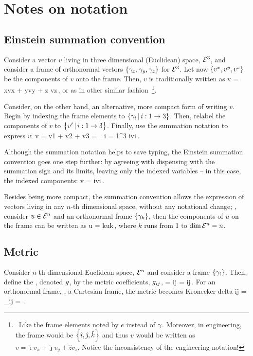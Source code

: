 \section{Notes on notation}

\subsection{Einstein summation convention}
Consider a vector $v$ living in three dimensional (Euclidean) space, $\mathcal{\mathcal{E}}^{3}$, and consider a frame of orthonormal vectors $\left\lbrace{\gamma_{x}, \gamma_{y}, \gamma_{z}}\right\rbrace$ for $\mathcal{\mathcal{E}}^{3}$. Let now $\left\lbrace{{v}^{x}, {v}^{y}, {v}^{z}}\right\rbrace$ be the components of $v$ onto the frame. Then, $v$ is traditionally written as
\beq
v = \fbvec x\fvec vx + \fbvec y\fvec vy + \fbvec z \fvec vz\,,
\eeq
or as in other similar fashion~\footnote{~Like the frame elements noted by $e$ instead of $\gamma_{}$. Moreover, in engineering, the frame would be $\left\lbrace{\hat\imath, \hat\jmath, \hat k}\right\rbrace$ and thus $v$ would be written as $v = \hat{\imath}v_x + \hat{\jmath}v_y + \hat{z}v_z$. Notice the inconsistency of the engineering notation!}.

Consider, on the other hand, an alternative, more compact form of writing $v$. Begin by indexing the frame elements to $\left\lbrace{{\gamma_{i}}\,|\,{i:1\to 3}}\right\rbrace$. Then, relabel the components of $v$ to $\left\lbrace{{{v}^{i}}\,|\,{i:1\to 3}}\right\rbrace$. Finally, use the summation notation to express $v$:
\beq
v = \fvec v1 + \fvec v2 + \fvec v3 
  = \sum_{i = 1}^3 \fbvec i\fvec vi\,.
\eeq

Although the summation notation helps to save typing, the Einstein summation convention goes one step further: by agreeing with dispensing with the summation sign and its limits, leaving only the indexed variables -- in this case, the indexed components:
\beq
v = \fbvec i\fvec vi\,.
\eeq

Besides being more compact, the summation convention allows the expression of vectors living in any $n$-th dimensional space, without any notational change; \eg, consider $u\in\mathcal{\mathcal{E}}^{n}$ and an orthonormal frame $\left\lbrace{\gamma_{k}}\right\rbrace$, then the components of $u$ on the frame can be written as
\beq
u = \fbvec k\fvec uk\,,
\eeq
where $k$ runs from 1 to $\dim\mathcal{\mathcal{E}}^{n} = n$.


\subsection{Metric}
Consider $n$-th dimensional Euclidean space, $\mathcal{\mathcal{E}}^{n}$ and consider a frame $\left\lbrace{\gamma_{i}}\right\rbrace$. Then, define the , denoted $g$, by the metric coefficients, $g_{{i}{j}}$,
\beq
\metric = \fmet ij = \fbvec i\iprod\fbvec j\,.
\eeq
For an orthonormal frame, \eg, a Cartesian frame, the metric becomes Kronecker delta
\beq
\fmet ij = \delta_{ij} = \diag{}\,.
\eeq



